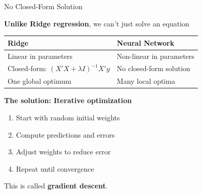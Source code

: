 \documentclass[10pt]{beamer}
\newcommand{\highlight}[1]{\textcolor{AccentOrange}{\textbf{#1}}}
\begin{document}
\begin{frame}{No Closed-Form Solution}

  \textbf{Unlike Ridge regression}, we can't just solve an equation

  \vspace{1em}
  \begin{center}
  \begin{tabular}{ll}
    \toprule
    \textbf{Ridge} & \textbf{Neural Network} \\
    \midrule
    Linear in parameters & Non-linear in parameters \\
    Closed-form: $(X'X + \lambda I)^{-1}X'y$ & No closed-form solution \\
    One global optimum & Many local optima \\
    \bottomrule
  \end{tabular}
  \end{center}

  \vspace{1em}
  \textbf{The solution: Iterative optimization}
  \begin{enumerate}
    \item Start with random initial weights
    \item Compute predictions and errors
    \item Adjust weights to reduce error
    \item Repeat until convergence
  \end{enumerate}

  \vspace{0.5em}
  This is called \highlight{gradient descent}.
\end{frame}

\end{document}
